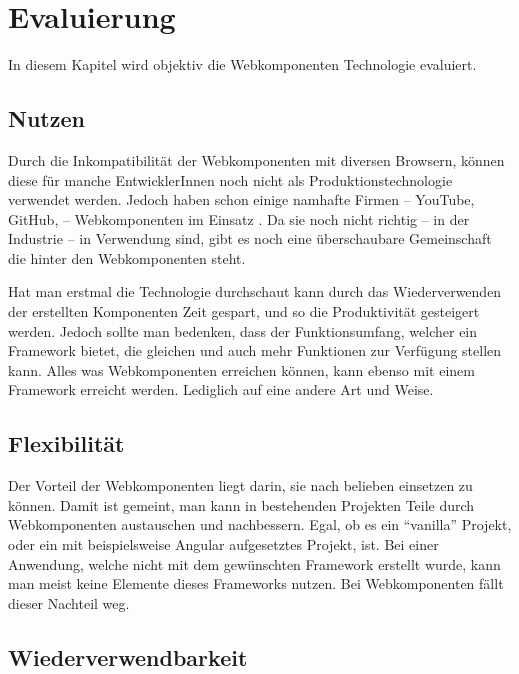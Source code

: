 \chapter{Evaluierung}
In diesem Kapitel wird objektiv die Webkomponenten Technologie evaluiert.

\section{Nutzen}
Durch die Inkompatibilität der Webkomponenten mit diversen Browsern, können diese für manche EntwicklerInnen noch nicht als Produktionstechnologie verwendet werden. Jedoch haben schon einige namhafte Firmen -- YouTube, GitHub, \etc -- Webkomponenten im Einsatz \cite{webcomponents-production-use}. 
Da sie noch nicht richtig -- in der Industrie -- in Verwendung sind, gibt es noch eine überschaubare Gemeinschaft die hinter den Webkomponenten steht. 

Hat man erstmal die Technologie durchschaut kann durch das Wiederverwenden der erstellten Komponenten Zeit gespart, und so die Produktivität gesteigert werden. Jedoch sollte man bedenken, dass der Funktionsumfang, welcher ein Framework bietet, die gleichen und auch mehr Funktionen zur Verfügung stellen kann. Alles was Webkomponenten erreichen können, kann ebenso mit einem Framework erreicht werden. Lediglich auf eine andere Art und Weise. 

\section{Flexibilität}
Der Vorteil der Webkomponenten liegt darin, sie nach belieben einsetzen zu können. Damit ist gemeint, man kann in bestehenden Projekten Teile durch Webkomponenten austauschen und nachbessern. Egal, ob es ein "`vanilla"' Projekt, oder ein mit beispielsweise Angular aufgesetztes Projekt, ist. Bei einer Anwendung, welche nicht mit dem gewünschten Framework erstellt wurde, kann man meist keine Elemente dieses Frameworks nutzen. Bei Webkomponenten fällt dieser Nachteil weg.

\section{Wiederverwendbarkeit}


